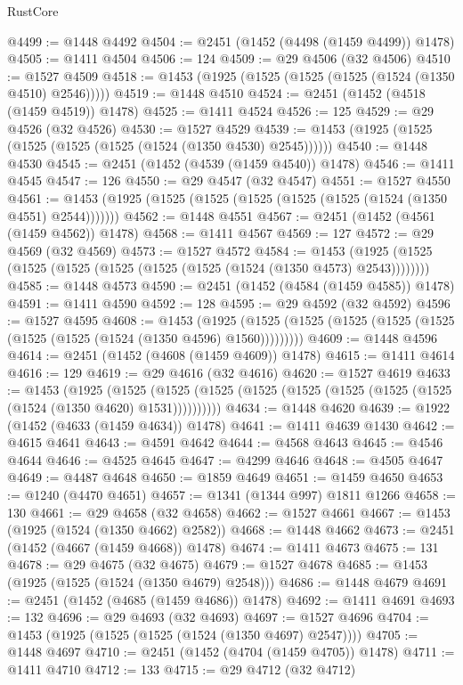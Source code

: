 \begin{lexlean}{RustCore}
\begin{coremodule}
@4499 := @1448 @4492
@4504 := @2451 (@1452 (@4498 (@1459 @4499)) @1478)
@4505 := @1411 @4504
@4506 := 124
@4509 := @29 @4506 (@32 @4506)
@4510 := @1527 @4509
@4518 := @1453 (@1925 (@1525 (@1525 (@1525 (@1524 (@1350 @4510) @2546)))))
@4519 := @1448 @4510
@4524 := @2451 (@1452 (@4518 (@1459 @4519)) @1478)
@4525 := @1411 @4524
@4526 := 125
@4529 := @29 @4526 (@32 @4526)
@4530 := @1527 @4529
@4539 := @1453 (@1925 (@1525 (@1525 (@1525 (@1525 (@1524 (@1350 @4530) @2545))))))
@4540 := @1448 @4530
@4545 := @2451 (@1452 (@4539 (@1459 @4540)) @1478)
@4546 := @1411 @4545
@4547 := 126
@4550 := @29 @4547 (@32 @4547)
@4551 := @1527 @4550
@4561 := @1453 (@1925 (@1525 (@1525 (@1525 (@1525 (@1525 (@1524 (@1350 @4551) @2544)))))))
@4562 := @1448 @4551
@4567 := @2451 (@1452 (@4561 (@1459 @4562)) @1478)
@4568 := @1411 @4567
@4569 := 127
@4572 := @29 @4569 (@32 @4569)
@4573 := @1527 @4572
@4584 := @1453 (@1925 (@1525 (@1525 (@1525 (@1525 (@1525 (@1525 (@1524 (@1350 @4573) @2543))))))))
@4585 := @1448 @4573
@4590 := @2451 (@1452 (@4584 (@1459 @4585)) @1478)
@4591 := @1411 @4590
@4592 := 128
@4595 := @29 @4592 (@32 @4592)
@4596 := @1527 @4595
@4608 := @1453
    (@1925 (@1525 (@1525 (@1525 (@1525 (@1525 (@1525 (@1525 (@1524 (@1350 @4596) @1560)))))))))
@4609 := @1448 @4596
@4614 := @2451 (@1452 (@4608 (@1459 @4609)) @1478)
@4615 := @1411 @4614
@4616 := 129
@4619 := @29 @4616 (@32 @4616)
@4620 := @1527 @4619
@4633 := @1453
    (@1925
      (@1525 (@1525 (@1525 (@1525 (@1525 (@1525 (@1525 (@1525 (@1524 (@1350 @4620) @1531))))))))))
@4634 := @1448 @4620
@4639 := @1922 (@1452 (@4633 (@1459 @4634)) @1478)
@4641 := @1411 @4639 @1430
@4642 := @4615 @4641
@4643 := @4591 @4642
@4644 := @4568 @4643
@4645 := @4546 @4644
@4646 := @4525 @4645
@4647 := @4299 @4646
@4648 := @4505 @4647
@4649 := @4487 @4648
@4650 := @1859 @4649
@4651 := @1459 @4650
@4653 := @1240 (@4470 @4651)
@4657 := @1341 (@1344 @997) @1811 @1266
@4658 := 130
@4661 := @29 @4658 (@32 @4658)
@4662 := @1527 @4661
@4667 := @1453 (@1925 (@1524 (@1350 @4662) @2582))
@4668 := @1448 @4662
@4673 := @2451 (@1452 (@4667 (@1459 @4668)) @1478)
@4674 := @1411 @4673
@4675 := 131
@4678 := @29 @4675 (@32 @4675)
@4679 := @1527 @4678
@4685 := @1453 (@1925 (@1525 (@1524 (@1350 @4679) @2548)))
@4686 := @1448 @4679
@4691 := @2451 (@1452 (@4685 (@1459 @4686)) @1478)
@4692 := @1411 @4691
@4693 := 132
@4696 := @29 @4693 (@32 @4693)
@4697 := @1527 @4696
@4704 := @1453 (@1925 (@1525 (@1525 (@1524 (@1350 @4697) @2547))))
@4705 := @1448 @4697
@4710 := @2451 (@1452 (@4704 (@1459 @4705)) @1478)
@4711 := @1411 @4710
@4712 := 133
@4715 := @29 @4712 (@32 @4712)

\end{coremodule}
\end{lexlean}
